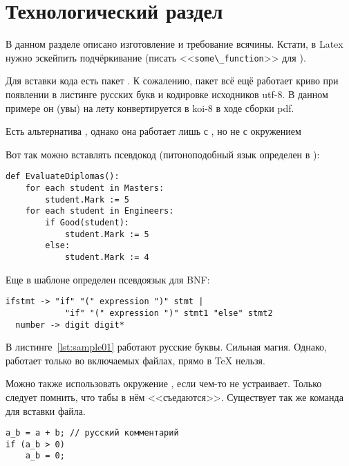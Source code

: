 \chapter{Технологический раздел}
\label{cha:impl}

В данном разделе описано изготовление и требование всячины. Кстати,
в Latex нужно эскейпить подчёркивание (писать <<\verb|some\_function|>> для ).

Для вставки кода есть пакет . К сожалению, пакет  всё ещё
работает криво при появлении в листинге русских букв и кодировке исходников utf-8.
В данном примере он (увы) на лету конвертируется в koi-8 в ходе сборки pdf.

Есть альтернатива , однако она работает лишь с
, но не с окружением 

Вот так можно вставлять псевдокод (питоноподобный язык определен в ):

\begin{lstlisting}[style=pseudocode,caption={Алгоритм оценки дипломных работ}]
def EvaluateDiplomas():
    for each student in Masters:
        student.Mark := 5
    for each student in Engineers:
        if Good(student):
            student.Mark := 5
        else:
            student.Mark := 4
\end{lstlisting}

Еще в шаблоне определен псевдоязык для BNF:

\begin{lstlisting}[style=grammar,basicstyle=\small,caption={Грамматика}]
  ifstmt -> "if" "(" expression ")" stmt |
            "if" "(" expression ")" stmt1 "else" stmt2
  number -> digit digit*
\end{lstlisting}

В листинге~\ref{lst:sample01} работают русские буквы. Сильная магия. Однако, работает
только во включаемых файлах, прямо в \TeX{} нельзя.







Можно также использовать окружение , если  чем-то не
устраивает. Только следует помнить, что табы в нём <<съедаются>>. Существует так же команда  для вставки файла.

\begin{verbatim}
a_b = a + b; // русский комментарий
if (a_b > 0)
    a_b = 0;
\end{verbatim}

